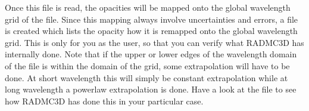 \documentclass[letterpaper,10pt,english]{sphinxmanual}
\begin{document}
Once this file is read, the opacities will be mapped onto the global
wavelength grid of the  file. Since this mapping
always involve uncertainties and errors, a file  is created which lists the opacity how it
is remapped onto the global wavelength grid. This is only for you as the
user, so that you can verify what RADMC\sphinxhyphen{}3D has internally done. Note that if
the upper or lower edges of the wavelength domain of the  file is within the domain of the  grid, some extrapolation will have to be done.  At
short wavelength this will simply be constant extrapolation while at long
wavelength a powerlaw extrapolation is done. Have a look at the  file to see how RADMC\sphinxhyphen{}3D has done this
in your particular case.
\end{document}
